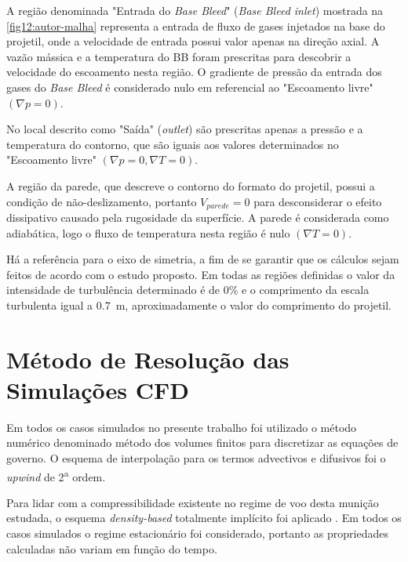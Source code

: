 A região denominada "Entrada do \textit{Base Bleed}"{} (\textit{Base Bleed inlet}) mostrada na \autoref{fig12:autor-malha} representa a entrada de fluxo de gases injetados na base do projetil, onde a velocidade de entrada possui valor apenas na direção axial. A vazão mássica e a temperatura do BB foram prescritas para descobrir a velocidade do escoamento nesta região. O gradiente de pressão da entrada dos gases do \textit{Base Bleed} é considerado nulo em referencial ao "Escoamento livre"{} \(\left(\nabla p = 0\right)\).

No local descrito como "Saída"{} (\textit{outlet}) são prescritas apenas a pressão e a temperatura do contorno, que são iguais aos valores determinados no "Escoamento livre"{} \(\left(\nabla p = 0, \nabla T = 0\right)\).

A região da parede, que descreve o contorno do formato do projetil, possui a condição de não-deslizamento, portanto \(V_{parede} = 0\) para desconsiderar o efeito dissipativo causado pela rugosidade da superfície. A parede é considerada como adiabática, logo o fluxo de temperatura nesta região é nulo \(\left(\nabla T = 0\right)\).

Há a referência para o eixo de simetria, a fim de se garantir que os cálculos sejam feitos de acordo com o estudo proposto. Em todas as regiões definidas o valor da intensidade de turbulência determinado é de 0\% e o comprimento da escala turbulenta igual a \qty{0,7}{\metre}, aproximadamente o valor do comprimento do projetil.

\section{Método de Resolução das Simulações CFD}\label{sec:metodo-resolucao-cfd}

Em todos os casos simulados no presente trabalho foi utilizado o método numérico denominado método dos volumes finitos \cite{McDonald1971,MacComarck&Paulay1972} para discretizar as equações de governo. O esquema de interpolação para os termos advectivos e difusivos foi o \textit{upwind} de 2\textsuperscript{a} ordem. 

Para lidar com a compressibilidade existente no regime de voo desta munição estudada, o esquema \textit{density-based} totalmente implícito foi aplicado \cite{Weiss1995PreconditioningAT,Weiss1997IMPLICITSO,Weiss1999ImplicitSO}. Em todos os casos simulados o regime estacionário foi considerado, portanto as propriedades calculadas não variam em função do tempo. 

